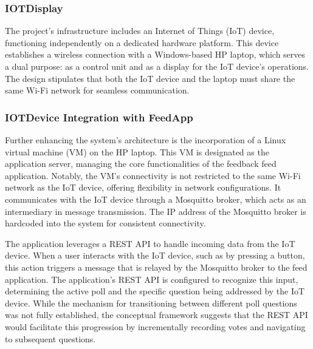 \subsubsection{IOTDisplay}
The project's infrastructure includes an Internet of Things (IoT) device, functioning independently on a dedicated hardware platform. This device establishes a wireless connection with a Windows-based HP laptop, which serves a dual purpose: as a control unit and as a display for the IoT device's operations. The design stipulates that both the IoT device and the laptop must share the same Wi-Fi network for seamless communication.

\subsubsection{IOTDevice Integration with FeedApp}
Further enhancing the system's architecture is the incorporation of a Linux virtual machine (VM) on the HP laptop. This VM is designated as the application server, managing the core functionalities of the feedback feed application. Notably, the VM's connectivity is not restricted to the same Wi-Fi network as the IoT device, offering flexibility in network configurations. It communicates with the IoT device through a Mosquitto broker, which acts as an intermediary in message transmission. The IP address of the Mosquitto broker is hardcoded into the system for consistent connectivity.

The application leverages a REST API to handle incoming data from the IoT device. When a user interacts with the IoT device, such as by pressing a button, this action triggers a message that is relayed by the Mosquitto broker to the feed application. The application's REST API is configured to recognize this input, determining the active poll and the specific question being addressed by the IoT device. While the mechanism for transitioning between different poll questions was not fully established, the conceptual framework suggests that the REST API would facilitate this progression by incrementally recording votes and navigating to subsequent questions.

